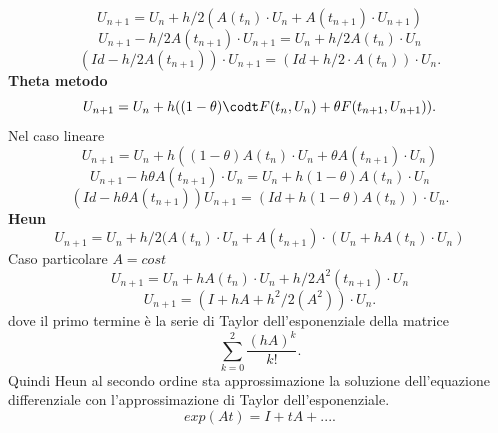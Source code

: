 \documentclass[12px]{article}
\begin{document}
	\[
		U_{n+1} = U_n + h/2(A(t_{n})\cdot U_{n}+ A(t_{n+1})\cdot U_{n+1})
	\] 
	\[
		U_{n+1}- h/2A(t_{n+1})\cdot U_{n+1} = U_n + h/2A(t_{n})\cdot U_{n}
	\] 
	\[
		(Id-h/2A(t_{n+1}))\cdot U_{n+1} = (Id + h/2\cdot A(t_n))\cdot U_n
	.\] 
	\textbf{Theta metodo}
	\[
		U_{n+1} = U_n + h((1-\theta)\codt F(t_{n},U_{n})+ \theta F(t_{n+1},U_{n+1}))
	.\]
Nel caso lineare
\[
	U_{n+1} = U_n + h((1-\theta)A(t_n)\cdot U_n + \theta A(t_{n+1})\cdot U_n)
\] 
\[
	U_{n+1}-h\theta A(t_{n+1})\cdot U_n = U_n + h(1-\theta)A(t_n)\cdot U_n 
\] 
\[
	(Id- h\theta A(t_{n+1}))U_{n+1} = (Id + h(1-\theta)A(t_n))\cdot U_n
.\] 
\textbf{Heun}\\
\[
	U_{n+1} = U_n + h/2 (A(t_n)\cdot U_n +  A(t_{n+1})\cdot (U_n + h A(t_n)\cdot U_n)
\] 
Caso particolare $A= cost$
\[
	U_{n+1} = U_n + h A(t_n)\cdot U_n + h/2 A^2(t_{n+1})\cdot U_n
\] 
\[
	U_{n+1} = (I+hA + h^2/2(A^2))\cdot U_n
.\] 
dove il primo termine è la serie di Taylor dell'esponenziale della matrice
\[
	\sum^{2}_{k=0}\frac{(hA)^k}{k!}
.\] 
Quindi Heun al secondo ordine sta approssimazione la soluzione dell'equazione differenziale con l'approssimazione di Taylor dell'esponenziale.
\[
exp(At) =I + tA + ...
.\] 
\end{document}
